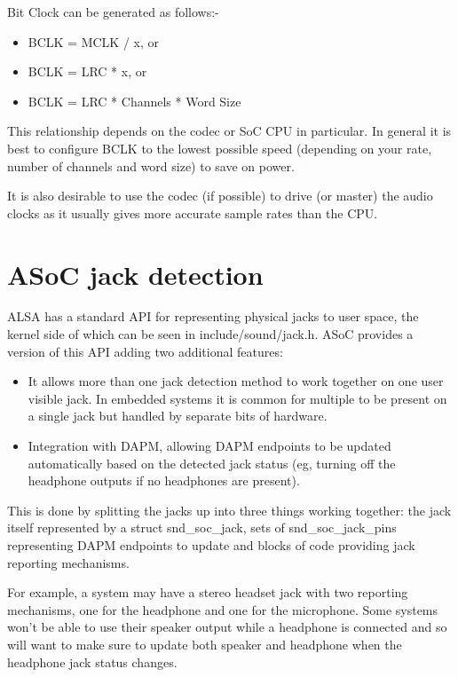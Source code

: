\documentclass[a4paper,8pt,english]{sphinxmanual}
\begin{document}
Bit Clock can be generated as follows:-
\begin{itemize}
\item {} 
BCLK = MCLK / x, or

\item {} 
BCLK = LRC * x, or

\item {} 
BCLK = LRC * Channels * Word Size

\end{itemize}

This relationship depends on the codec or SoC CPU in particular. In general
it is best to configure BCLK to the lowest possible speed (depending on your
rate, number of channels and word size) to save on power.

It is also desirable to use the codec (if possible) to drive (or master) the
audio clocks as it usually gives more accurate sample rates than the CPU.


\section{ASoC jack detection}
\label{sound/soc/jack::doc}\label{sound/soc/jack:asoc-jack-detection}
ALSA has a standard API for representing physical jacks to user space,
the kernel side of which can be seen in include/sound/jack.h.  ASoC
provides a version of this API adding two additional features:
\begin{itemize}
\item {} 
It allows more than one jack detection method to work together on one
user visible jack.  In embedded systems it is common for multiple
to be present on a single jack but handled by separate bits of
hardware.

\item {} 
Integration with DAPM, allowing DAPM endpoints to be updated
automatically based on the detected jack status (eg, turning off the
headphone outputs if no headphones are present).

\end{itemize}

This is done by splitting the jacks up into three things working
together: the jack itself represented by a struct snd\_soc\_jack, sets of
snd\_soc\_jack\_pins representing DAPM endpoints to update and blocks of
code providing jack reporting mechanisms.

For example, a system may have a stereo headset jack with two reporting
mechanisms, one for the headphone and one for the microphone.  Some
systems won't be able to use their speaker output while a headphone is
connected and so will want to make sure to update both speaker and
headphone when the headphone jack status changes.
\end{document}
